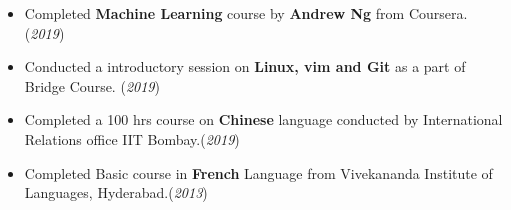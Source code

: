 \documentclass[10pt]{article}
\begin{document}
\colorbox{bl}{}
\vspace{-0.58cm}
\begin{itemize}[leftmargin=0.4cm]
    \item { Completed \textbf{Machine Learning} course by \textbf{Andrew Ng} from Coursera. }\hfill{(\textit{2019})}\vspace{-0.2cm}
        \item {Conducted a introductory session on \textbf{Linux, vim and Git} as a part of Bridge Course. }\hfill{(\textit{2019})}\vspace{-0.2cm}
    \item {Completed a 100 hrs course on \textbf{Chinese} language conducted by International Relations office IIT Bombay.}\hfill{(\textit{2019})}\vspace{-0.2cm}
    \item {Completed Basic course in \textbf{French} Language from Vivekananda Institute of Languages, Hyderabad.}\hfill{(\textit{2013})}\vspace{-0.2cm}
\end{itemize}

\end{document}
